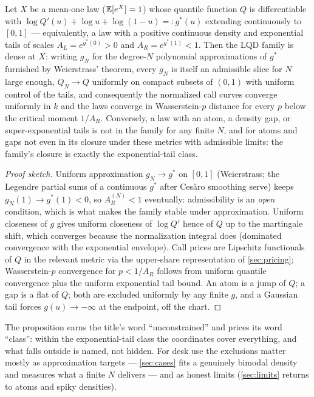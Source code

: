 \documentclass[11pt]{article}
\begin{document}
\begin{proposition}
\label{prop:dense}
Let $X$ be a mean-one law ($\mathbb{E}[e^{X}]=1$) whose quantile function $Q$ is
differentiable with $\log Q'(u) + \log u + \log(1-u) =: g^{\ast}(u)$
extending continuously to $[0,1]$ --- equivalently, a law with a positive
continuous density and exponential tails of scales $A_L=e^{g^\ast(0)}>0$ and
$A_R=e^{g^\ast(1)}<1$.  Then the LQD family is dense at $X$: writing
$g_N$ for the degree-$N$ polynomial approximations of $g^{\ast}$ furnished
by Weierstrass' theorem, every $g_N$ is itself an admissible slice for $N$
large enough, $Q_N\to Q$ uniformly on compact subsets of $(0,1)$ with
uniform control of the tails, and consequently the normalized call curves
converge uniformly in $k$ and the laws converge in Wasserstein-$p$ distance
for every $p$ below the critical moment $1/A_R$.  Conversely, a law with an
atom, a density gap, or super-exponential tails is not in the family for any
finite $N$, and for atoms and gaps not even in its closure under these
metrics with admissible limits: the family's closure is exactly the
exponential-tail class.
\end{proposition}

\begin{proof}[Proof sketch]
Uniform approximation $g_N\to g^{\ast}$ on $[0,1]$ (Weierstrass; the
Legendre partial sums of a continuous $g^{\ast}$ after Ces\`aro smoothing
serve) keeps $g_N(1)\to g^{\ast}(1)<0$, so $A_R^{(N)}<1$ eventually:
admissibility is an \emph{open} condition, which is what makes the family
stable under approximation.  Uniform closeness of $g$ gives uniform
closeness of $\log Q'$ hence of $Q$ up to the martingale shift, which
converges because the normalization integral does (dominated convergence
with the exponential envelope).  Call prices are Lipschitz functionals of
$Q$ in the relevant metric via the upper-share representation of
\cref{sec:pricing}; Wasserstein-$p$ convergence for $p<1/A_R$ follows from
uniform quantile convergence plus the uniform exponential tail bound.  An
atom is a jump of $Q$; a gap is a flat of $Q$; both are excluded uniformly
by any finite $g$, and a Gaussian tail forces
$g(u)\to-\infty$ at the endpoint, off the chart.
\end{proof}

The proposition earns the title's word ``unconstrained'' and prices its
word ``class'': within the exponential-tail class the coordinates cover
everything, and what falls outside is named, not hidden.  For desk use the
exclusions matter mostly as approximation targets --- \cref{sec:cases}
fits a genuinely bimodal density and measures what a finite $N$ delivers
--- and as honest limits (\cref{sec:limits} returns to atoms and spiky
densities).
\end{document}
